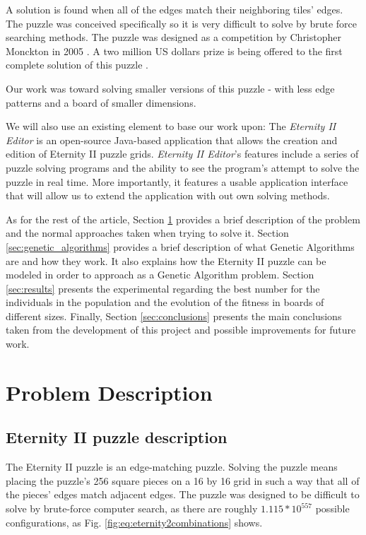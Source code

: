 \documentclass{llncs}
\begin{document}
A solution is found when all of the edges match their neighboring tiles' edges. The puzzle was conceived specifically so it is very difficult to solve by brute force searching methods. The puzzle was designed as a competition by Christopher Monckton in 2005 \cite{monckton}. A two million US dollars prize is being offered to the first complete solution of this puzzle \cite{unsolved}.

Our work was toward solving smaller versions of this puzzle - with less edge patterns and a board of smaller dimensions.

We will also use an existing element to base our work upon: The \textit{Eternity II Editor} is an open-source Java-based application that allows the creation and edition of Eternity II puzzle grids. \textit{Eternity II Editor}'s features include a series of puzzle solving programs and the ability to see the program's attempt to solve the puzzle in real time. More importantly, it features a usable application interface that will allow us to extend the application with out own solving methods.

As for the rest of the article, Section \ref{sec:problem_description} provides a brief description of the problem and the normal approaches taken when trying to solve it. Section \ref{sec:genetic_algorithms} provides a brief description of what Genetic Algorithms are and how they work. It also explains how the Eternity II puzzle can be modeled in order to approach as a Genetic Algorithm problem. Section \ref{sec:results} presents the experimental regarding the best number for the individuals in the population and the evolution of the fitness in boards of different sizes. Finally, Section \ref{sec:conclusions} presents the main conclusions taken from the development of this project and possible improvements for future work.

\section{Problem Description}\label{sec:problem_description}

\subsection{Eternity II puzzle description}\label{sec:puzzle_description}

The Eternity II puzzle is an edge-matching puzzle. Solving the puzzle means placing the puzzle's 256 square pieces on a 16 by 16 grid in such a way that all of the pieces' edges match adjacent edges. The puzzle was designed to be difficult to solve by brute-force computer search, as there are roughly $1.115 * 10 ^ {557}$ possible configurations, as Fig. \ref{fig:eq:eternity2combinations} shows.
\end{document}
